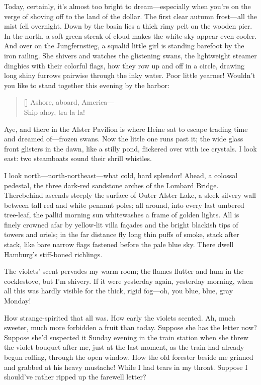 \documentclass[12pt,a4paper]{article}
\begin{document}
Today, certainly, it’s almost too bright to dream—especially when you’re on the verge of shoving off to the land of the dollar. The first clear autumn frost—all the mist fell overnight. Down by the basin lies a thick rimy pelt on the wooden pier. In the north, a soft green streak of cloud makes the white sky appear even cooler. And over on the Jungfernstieg, a squalid little girl is standing barefoot by the iron railing. She shivers and watches the glistening swans, the lightweight steamer dinghies with their colorful flags, how they row up and off in a circle, drawing long shiny furrows pairwise through the inky water. Poor little yearner! Wouldn’t you like to stand together this evening by the harbor:
\settowidth{\versewidth}{Ashore, aboard, America—}
\begin{verse}[\versewidth]
Ashore, aboard, America— \\
Ship ahoy, tra-la-la!
\end{verse}

Aye, and there in the Alster Pavilion is where Heine sat to escape trading time and dreamed of—frozen swans. Now the little one runs past it; the wide glass front glisters in the dawn, like a stilly pond, flickered over with ice crystals. I look east: two steamboats sound their shrill whistles.

I look north—north-northeast—what cold, hard splendor! Ahead, a colossal pedestal, the three dark-red sandstone arches of the Lombard Bridge. Therebehind ascends steeply the surface of Outer Alster Lake, a sleek silvery wall between tall red and white pennant poles; all around, into every last umbered tree-leaf, the pallid morning sun whitewashes a frame of golden lights. All is finely crowned afar by yellow-lit villa façades and the bright blackish tips of towers and oriels; in the far distance fly long thin puffs of smoke, stack after stack, like bare narrow flags fastened before the pale blue sky. There dwell Hamburg’s stiff-boned richlings.

The violets’ scent pervades my warm room; the flames flutter and hum in the cocklestove, but I’m shivery. If it were yesterday again, yesterday morning, when all this was hardly visible for the thick, rigid fog—oh, you blue, blue, gray Monday!

How strange-spirited that all was. How early the violets scented. Ah, much sweeter, much more forbidden a fruit than today. Suppose she has the letter now? Suppose she’d suspected it Sunday evening in the train station when she threw the violet bouquet after me, just at the last moment, as the train had already begun rolling, through the open window. How the old forester beside me grinned and grabbed at his heavy mustache! While I had tears in my throat. Suppose I should’ve rather ripped up the farewell letter?
\end{document}
